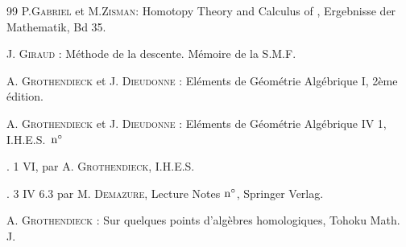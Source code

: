 \documentclass[10pt]{../fichiers-configuration-latex/smfart}
\begin{document}
\begin{thebibliography}{99}\pageoriginale
{} P.\textsc{Gabriel} et M.\textsc{Zisman}: Homotopy Theory
  and Calculus   of , Ergebnisse der Mathematik, Bd 35.

 J. \textsc{Giraud} : Méthode de la descente. Mémoire de la S.M.F.

 A. \textsc{Grothendieck} et J. \textsc{Dieudonne} : Eléments de
  Géométrie Algébrique I, 2ème édition.

 A. \textsc{Grothendieck} et J. \textsc{Dieudonne} : Eléments de
  Géométrie Algébrique IV 1, I.H.E.S.~${\rm n^{\circ}}$

 \SGA. 1 VI, par A. \textsc{Grothendieck}, I.H.E.S.

 \SGA. 3 IV 6.3 par M. \textsc{Demazure}, Lecture Notes
  ${\rm n^{\circ}}$, Springer Verlag.

 A. \textsc{Grothendieck} : Sur quelques points d'algèbres
  homologiques, Tohoku Math. J.
\end{thebibliography}

\ifx\danslelivre\undefined
\end{document}
